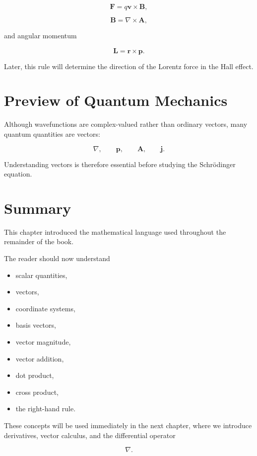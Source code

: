 \documentclass[11pt,a4paper,openany]{book}
\begin{document}
\[
\mathbf F=q\mathbf v\times\mathbf B,
\]

\[
\mathbf B=\nabla\times\mathbf A,
\]

and angular momentum

\[
\mathbf L
=
\mathbf r\times\mathbf p.
\]

Later, this rule will determine the direction of the Lorentz force in the Hall effect.


\section{Preview of Quantum Mechanics}

Although wavefunctions are complex-valued rather than ordinary vectors,
many quantum quantities are vectors:

\[
\nabla,
\qquad
\mathbf p,
\qquad
\mathbf A,
\qquad
\mathbf j.
\]

Understanding vectors is therefore essential before studying the Schrödinger equation.


\section{Summary}

This chapter introduced the mathematical language used throughout the remainder of the book.

The reader should now understand

\begin{itemize}
	\item scalar quantities,
	\item vectors,
	\item coordinate systems,
	\item basis vectors,
	\item vector magnitude,
	\item vector addition,
	\item dot product,
	\item cross product,
	\item the right-hand rule.
\end{itemize}

These concepts will be used immediately in the next chapter, where we introduce derivatives, vector calculus, and the differential operator

\[
\nabla.
\]
\end{document}
